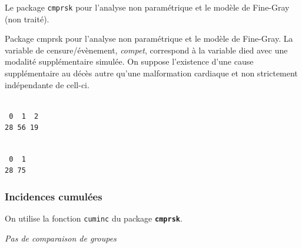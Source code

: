 \documentclass[
  12pt,
  letterpaper,
  DIV=11,
  numbers=noendperiod,
  onepage,
  openany]{scrreprt}
\newenvironment{Shaded}{\begin{snugshade}}{\end{snugshade}}
\newcommand{\CommentTok}[1]{\textcolor[rgb]{0.50,0.62,0.50}{#1}}
\newcommand{\FunctionTok}[1]{\textcolor[rgb]{0.94,0.94,0.56}{#1}}
\newcommand{\NormalTok}[1]{\textcolor[rgb]{0.80,0.80,0.80}{#1}}
\newcommand{\OtherTok}[1]{\textcolor[rgb]{0.94,0.94,0.56}{#1}}
\newcommand{\SpecialCharTok}[1]{\textcolor[rgb]{0.86,0.64,0.64}{#1}}
\newcommand{\StringTok}[1]{\textcolor[rgb]{0.80,0.58,0.58}{#1}}
\begin{document}
Le package \texttt{cmprsk} pour l'analyse non paramétrique et le modèle
de Fine-Gray (non traité).

Package cmprsk pour l'analyse non paramétrique et le modèle de
Fine-Gray. La variable de censure/évènement, \emph{compet}, correspond à
la variable died avec une modalité supplémentaire simulée. On suppose
l'existence d'une cause supplémentaire au décès autre qu'une
malformation cardiaque et non strictement indépendante de cell-ci.

\begin{Shaded}
\end{Shaded}

\begin{verbatim}

 0  1  2 
28 56 19 
\end{verbatim}

\begin{Shaded}
\end{Shaded}

\begin{verbatim}

 0  1 
28 75 
\end{verbatim}

\hypertarget{incidences-cumuluxe9es}{%
\subsubsection{Incidences cumulées}\label{incidences-cumuluxe9es}}

On utilise la fonction \texttt{cuminc} du package
\textbf{\texttt{cmprsk}}.

\emph{Pas de comparaison de groupes}

\begin{Shaded}
\end{Shaded}
\end{document}
